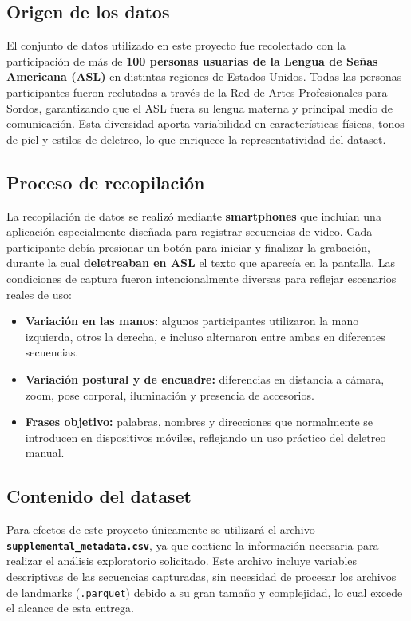 \documentclass[12pt]{article}
\begin{document}
\subsection{Origen de los datos}
El conjunto de datos utilizado en este proyecto fue recolectado con la participación de más de \textbf{100 personas usuarias de la Lengua de Señas Americana (ASL)} en distintas regiones de Estados Unidos. Todas las personas participantes fueron reclutadas a través de la Red de Artes Profesionales para Sordos, garantizando que el ASL fuera su lengua materna y principal medio de comunicación. Esta diversidad aporta variabilidad en características físicas, tonos de piel y estilos de deletreo, lo que enriquece la representatividad del dataset.

\subsection{Proceso de recopilación}
La recopilación de datos se realizó mediante \textbf{smartphones} que incluían una aplicación especialmente diseñada para registrar secuencias de video. Cada participante debía presionar un botón para iniciar y finalizar la grabación, durante la cual \textbf{deletreaban en ASL} el texto que aparecía en la pantalla.  
Las condiciones de captura fueron intencionalmente diversas para reflejar escenarios reales de uso:
\begin{itemize}
    \item \textbf{Variación en las manos:} algunos participantes utilizaron la mano izquierda, otros la derecha, e incluso alternaron entre ambas en diferentes secuencias.
    \item \textbf{Variación postural y de encuadre:} diferencias en distancia a cámara, zoom, pose corporal, iluminación y presencia de accesorios.
    \item \textbf{Frases objetivo:} palabras, nombres y direcciones que normalmente se introducen en dispositivos móviles, reflejando un uso práctico del deletreo manual.
\end{itemize}

\subsection{Contenido del dataset}
Para efectos de este proyecto únicamente se utilizará el archivo \textbf{\texttt{supplemental\_metadata.csv}}, ya que contiene la información necesaria para realizar el análisis exploratorio solicitado. Este archivo incluye variables descriptivas de las secuencias capturadas, sin necesidad de procesar los archivos de landmarks (\texttt{.parquet}) debido a su gran tamaño y complejidad, lo cual excede el alcance de esta entrega.  
\end{document}
